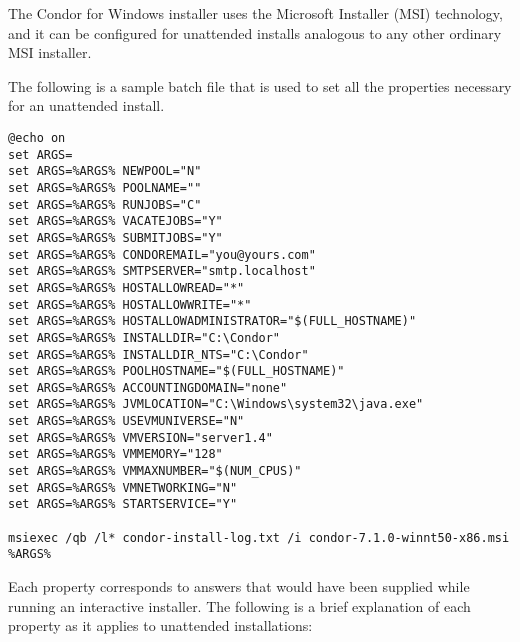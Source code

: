 The Condor for Windows installer uses the Microsoft Installer (MSI)
technology, and it can be configured for unattended installs analogous
to any other ordinary MSI installer.

The following is a sample batch file that is used to set all the
properties necessary for an unattended install.

\begin{verbatim}
@echo on
set ARGS=
set ARGS=%ARGS% NEWPOOL="N"
set ARGS=%ARGS% POOLNAME=""
set ARGS=%ARGS% RUNJOBS="C"
set ARGS=%ARGS% VACATEJOBS="Y"
set ARGS=%ARGS% SUBMITJOBS="Y"
set ARGS=%ARGS% CONDOREMAIL="you@yours.com"
set ARGS=%ARGS% SMTPSERVER="smtp.localhost"
set ARGS=%ARGS% HOSTALLOWREAD="*"
set ARGS=%ARGS% HOSTALLOWWRITE="*"
set ARGS=%ARGS% HOSTALLOWADMINISTRATOR="$(FULL_HOSTNAME)"
set ARGS=%ARGS% INSTALLDIR="C:\Condor"
set ARGS=%ARGS% INSTALLDIR_NTS="C:\Condor"
set ARGS=%ARGS% POOLHOSTNAME="$(FULL_HOSTNAME)"
set ARGS=%ARGS% ACCOUNTINGDOMAIN="none"
set ARGS=%ARGS% JVMLOCATION="C:\Windows\system32\java.exe"
set ARGS=%ARGS% USEVMUNIVERSE="N"
set ARGS=%ARGS% VMVERSION="server1.4"
set ARGS=%ARGS% VMMEMORY="128"
set ARGS=%ARGS% VMMAXNUMBER="$(NUM_CPUS)"
set ARGS=%ARGS% VMNETWORKING="N"
set ARGS=%ARGS% STARTSERVICE="Y"

msiexec /qb /l* condor-install-log.txt /i condor-7.1.0-winnt50-x86.msi %ARGS%
\end{verbatim}

Each property corresponds to answers that would have been
supplied while running an interactive installer.
The following is a brief explanation of each property
as it applies to unattended installations:

